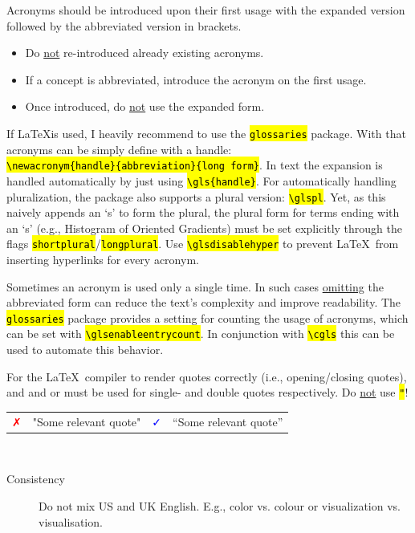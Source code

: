 \documentclass[10pt, a4paper]{article}
\newcommand{\code}[1]{\texttt{\hl{#1}}}
\newcommand{\genericbox}[4]{%
\footnotesize
\begin{tcolorbox}[width=.95\textwidth,colback={#1},title={#3},colbacktitle={#2},coltitle=black]
#4
\end{tcolorbox}
\normalsize
}
\newcommand{\examplesbox}[1]{%
\genericbox{blue!10!white}{blue!30!white}{\faHandORight\ Examples}{#1}
}
\newcommand{\protipbox}[1]{%
\genericbox{yellow!10!white}{yellow!30!white}{\faLightbulbO\ Pro Tip}{#1}
}
\newcommand{\exampleFalse}{%
    \textcolor{red}{\faClose}
}
\newcommand{\exampleCorrect}{%
    \textcolor{blue}{\faCheck}
}
\begin{document}
\begin{enumdescript}
    \item [Usage of Acronyms] Acronyms should be introduced upon their first usage with the expanded version followed by the abbreviated version in brackets. 
        \begin{itemize}
            \item Do \underline{not} re-introduced already existing acronyms.
            \item If a concept is abbreviated, introduce the acronym on the first usage. 
            \item Once introduced, do \underline{not} use the expanded form. 
        \end{itemize}
    If \LaTeX is used, I heavily recommend to use the \code{glossaries} package. With that acronyms can be simply define with a handle: \\\code{\textbackslash newacronym\{handle\}\{abbreviation\}\{long form\}}. In text the expansion is handled automatically by just using \code{\textbackslash gls\{handle\}}. 
    For automatically handling pluralization, the package also supports a plural version: \code{\textbackslash glspl}. Yet, as this na\:ively appends an `s' to form the plural, the plural form for terms ending with an `s' (e.g., Histogram of Oriented Gradients) must be set explicitly through the flags \code{shortplural}/\code{longplural}.
    Use \code{\textbackslash glsdisablehyper} to prevent \LaTeX\ from inserting hyperlinks for every acronym.

    \protipbox{Sometimes an acronym is used only a single time. In such cases \uline{omitting} the abbreviated form can reduce the text's complexity and improve readability. 
    The \code{glossaries} package provides a setting for counting the usage of acronyms, which can be set with \code{\textbackslash glsenableentrycount}. In conjunction with \code{\textbackslash cgls} this can be used to automate this behavior. 
    }  
    
    \item [Smart Quotes] For the \LaTeX\ compiler to render quotes correctly (i.e., opening/closing quotes), \code{\textasciigrave} and \code{\textquotesingle} and \code{\textasciigrave\textasciigrave} or \code{\textquotesingle \textquotesingle} must be used for single- and double quotes respectively. Do \underline{not} use \code{"}!
    \examplesbox{
       \begin{tabularx}{\textwidth}{p{4mm}@{}X|p{4mm}@{}X}
           \exampleFalse & "Some relevant quote" 
           & \exampleCorrect & ``Some relevant quote'' \\
       \end{tabularx}
    }   
    \item [Language] ~
        \begin{description}
            \item[Consistency] Do not mix US and UK English. E.g., color vs. colour or visualization vs. visualisation. 


\end{description}
\end{enumdescript}
\end{document}

